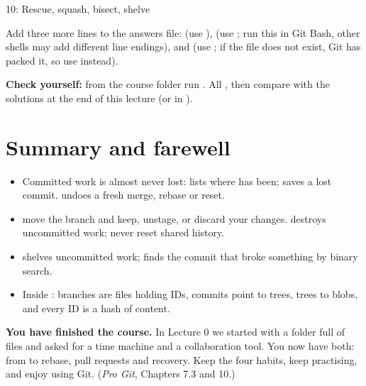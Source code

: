 \begin{homework}{10: Rescue, squash, bisect, shelve}
\begin{description}[leftmargin=1.2em,style=nextline]
\item[10.5 Look inside] Add three more lines to the answers file:  (use ),  (use ; run this in Git Bash, other shells may add different line endings), and  (use ; if the file does not exist, Git has packed it, so use  instead).
\end{description}

\textbf{Check yourself:} from the course folder run . All , then compare with the solutions at the end of this lecture (or in ).
\end{homework}

\section{Summary and farewell}

\begin{itemize}
  \item Committed work is almost never lost:  lists where  has been;  saves a lost commit.  undoes a fresh merge, rebase or reset.
  \item {} move the branch and keep, unstage, or discard your changes.  destroys uncommitted work; never reset shared history.
  \item {} shelves uncommitted work;  finds the commit that broke something by binary search.
  \item Inside : branches are files holding IDs, commits point to trees, trees to blobs, and every ID is a hash of content.
\end{itemize}

\textbf{You have finished the course.} In Lecture 0 we started with a folder full of \allowbreak{} files and asked for a time machine and a collaboration tool. You now have both: from  to rebase, pull requests and recovery. Keep the four habits, keep practising, and enjoy using Git. (\emph{Pro Git}, Chapters 7.3 and 10.)

\solutionspage




